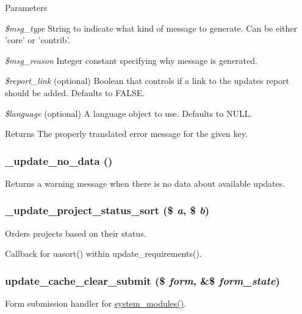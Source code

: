 \begin{DoxyParams}{Parameters}
\item[{\em \$msg\_\-type}]String to indicate what kind of message to generate. Can be either 'core' or 'contrib'. \item[{\em \$msg\_\-reason}]Integer constant specifying why message is generated. \item[{\em \$report\_\-link}](optional) Boolean that controls if a link to the updates report should be added. Defaults to FALSE. \item[{\em \$language}](optional) A language object to use. Defaults to NULL.\end{DoxyParams}
\begin{DoxyReturn}{Returns}
The properly translated error message for the given key. 
\end{DoxyReturn}
\hypertarget{update_8module_a959ca989c19a2a887014b7bb774fcba9}{
\subsubsection[{\_\-update\_\-no\_\-data}]{\setlength{\rightskip}{0pt plus 5cm}\_\-update\_\-no\_\-data ()}}
\label{update_8module_a959ca989c19a2a887014b7bb774fcba9}
Returns a warning message when there is no data about available updates. \hypertarget{update_8module_a80bf4d8130f541b0487ce74cdcd824b8}{
\subsubsection[{\_\-update\_\-project\_\-status\_\-sort}]{\setlength{\rightskip}{0pt plus 5cm}\_\-update\_\-project\_\-status\_\-sort (\$ {\em a}, \/  \$ {\em b})}}
\label{update_8module_a80bf4d8130f541b0487ce74cdcd824b8}
Orders projects based on their status.

Callback for uasort() within update\_\-requirements(). \hypertarget{update_8module_a3b1cd668c7aa9cc82f1e05b5a046d04f}{
\subsubsection[{update\_\-cache\_\-clear\_\-submit}]{\setlength{\rightskip}{0pt plus 5cm}update\_\-cache\_\-clear\_\-submit (\$ {\em form}, \/  \&\$ {\em form\_\-state})}}
\label{update_8module_a3b1cd668c7aa9cc82f1e05b5a046d04f}
Form submission handler for \hyperlink{group__forms_gaf4691243ea56e10a971d3d04a94c47b1}{system\_\-modules()}.


